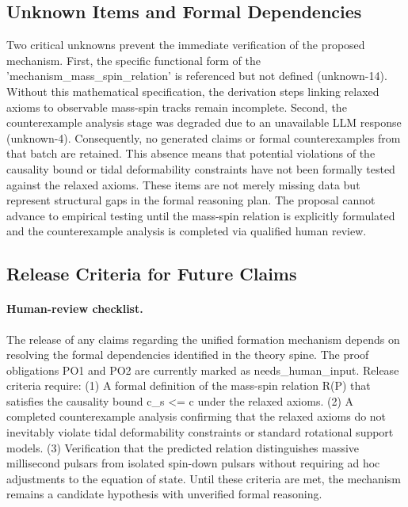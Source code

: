 \documentclass[conference]{IEEEtran}
\begin{document}
\subsection{Unknown Items and Formal Dependencies}
Two critical unknowns prevent the immediate verification of the proposed mechanism. First, the specific functional form of the 'mechanism\_mass\_spin\_relation' is referenced but not defined (unknown-14). Without this mathematical specification, the derivation steps linking relaxed axioms to observable mass-spin tracks remain incomplete. Second, the counterexample analysis stage was degraded due to an unavailable LLM response (unknown-4). Consequently, no generated claims or formal counterexamples from that batch are retained. This absence means that potential violations of the causality bound or tidal deformability constraints have not been formally tested against the relaxed axioms. These items are not merely missing data but represent structural gaps in the formal reasoning plan. The proposal cannot advance to empirical testing until the mass-spin relation is explicitly formulated and the counterexample analysis is completed via qualified human review.

\subsection{Release Criteria for Future Claims}
\paragraph{Human-review checklist.} The release of any claims regarding the unified formation mechanism depends on resolving the formal dependencies identified in the theory spine. The proof obligations PO1 and PO2 are currently marked as needs\_human\_input. Release criteria require: (1) A formal definition of the mass-spin relation R(P) that satisfies the causality bound c\_s <= c under the relaxed axioms. (2) A completed counterexample analysis confirming that the relaxed axioms do not inevitably violate tidal deformability constraints or standard rotational support models. (3) Verification that the predicted relation distinguishes massive millisecond pulsars from isolated spin-down pulsars without requiring ad hoc adjustments to the equation of state. Until these criteria are met, the mechanism remains a candidate hypothesis with unverified formal reasoning.

\end{document}
